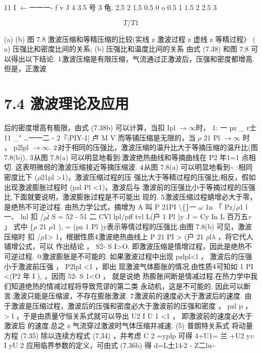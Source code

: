 11 I $\leftarrow$一一一- f v J 4 3.5 号 3 龟. 2.5 2 1.5 0.5 0 o 0.5 1 1.5 2 2.5 3

\[T/T1\]

(a) (b) 图 7.8 激波压缩和等精压缩的比较(实线 z 激波过程 z 虚线 z 等精过程〉 ( a) 压强比和密度比间的关系; (b) 压强比和温度比间的关系 由式 (7.38) 和图 7.8 可以得出以下结论. ${\rm 1}$激波压缩是有限压缩，气流通过正激波后，压强和密度都增高.但是，正激波

\section*{7.4  激波理论及应用}

后的密度增高有极限，由式 (7.38b) 可以计算，当扣 Ipl $\rightarrow$$\infty$时， 1: 一 pz \_ r士11 \_" …一一二 - 2『;PIY-1| 卢 M V 而等铺压缩是无限的，当 $\rho$ 21 Pl $\rightarrow$$\infty$ 时 ， p2lpl $\rightarrow$$\infty$. ${\rm 2}$对于相同的压强比，激波压缩的温升比大于等摘压缩的温升比(图 7.8(b)). ${\rm 3}$从图 7.8(a) 可以明显地看到:激波绝热曲线和等摘曲线在 P2 年1=1 点相切. 这表明微弱的激波压缩接近等摘压缩波. ${\rm 4}$从图 7.8(a) 可以明显地看到\textasciitilde{} :相同密度比下 ($\rho$21pl >1)，激波压缩过程的压 强比大于等精过程的压强比;相反，假如出现激波膨胀过程时 (pzl Pl <1)，激波后与 激波前的压强比小于等摘过程的压强比.下面就要说明，激波膨胀过程是不可能出 现的. ${\rm 5}$激波压缩过程蜻增必大于零，是绝热不可逆过程. 由热力学公式，摘增为 A 叫 P 21PI \textbackslash\{\}一 $\omega$ 1n 「 Pz/$\rho$1 l 一、 lnl 扣 /$\rho$$\tilde{l}$ S = 52 - 51 二 CVl lpl/pff tvl L(户 1 Pl )y J = Cy In L 百万五$\tau$ 」 式中 \{$\rho$ 21 $\rho$1 ), = (pz 1 Pl )y表示等情过程的压强比.由图 7.8(b) 可见，激波压缩时 扣 /$\rho$1> 1，根据性质${\rm 4}$激波绝热曲线上 P 21 PI > (户 21 $\rho$l$\lambda$ ，将它代人铺增公式，可以 作出结论 ， S2- S I>O. 即激波压缩是情增过程，因此是绝热不可逆过程. @激波膨胀是不可能的. 如果激波过程中出现 pzlpl<l ， 激波后的压强小于激波前压强 ， P2lpl <1 ，即出 现激波气体膨胀的情况.由性质${\rm 4}$可知如 1 PI <(P2 年 I ), ，因而 52- S 1<O ， 就是说绝 热膨胀间断是情减过程.在热力学中我们知道绝热的情减过程将导致荒谬的第二类 永动机，这是不可能的. 因此可以断言:激波只能是压缩波，不存在膨胀激波. ${\rm 7}$激波前的速度必大于激波后的速度. 由于激波是压缩过程，激波后的压强和密度必大于激波前的压强和密度 ， pzl p ， > l ，于是由质量守恒关系式就可以导出 U2 I U 1 <1 ， 即激波前的速度必大于激波后 的速度.总之 z 气流穿过激波时气体压缩并减速. (5) 普朗特关系式 将动量方程 (7.35) 除以连续方程式 (7.34) ，并考虑 C 2 =yplp 可得 4+U1= 兰 +U2 y$\upsilon$ I yU 2 应用临界参数的定义，可由式 (7.36b) 得 d=L土14$\cdot $2 - Z二lu\textasciitilde{}

